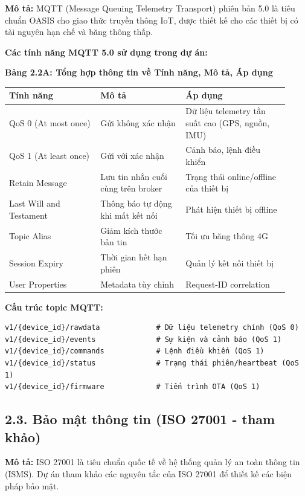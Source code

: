 \documentclass[13pt,a4paper]{extarticle}
\newcounter{none} %
\newcommand{\thesislongtableorignewline}{}
\let\thesislongtableorignewline\\
\renewcommand{\\}{\thesislongtableorignewline\hline}%
\let\\\thesislongtableorignewline
\newcommand{\thesistabletitle}[1]{%
  \begin{center}\textbf{#1}\end{center}%
}
\begin{document}
\textbf{Mô tả:} MQTT (Message Queuing Telemetry Transport) phiên bản 5.0
là tiêu chuẩn OASIS cho giao thức truyền thông IoT, được thiết kế cho
các thiết bị có tài nguyên hạn chế và băng thông thấp.

\textbf{Các tính năng MQTT 5.0 sử dụng trong dự án:}

{\def\LTcaptype{none} %
\thesistabletitle{Bảng 2.2A: Tổng hợp thông tin về Tính năng, Mô tả, Áp dụng}

\begin{longtable}{|p{0.30\linewidth}|p{0.28\linewidth}|p{0.34\linewidth}|}
\hline \textbf{Tính năng} & \textbf{Mô tả} & \textbf{Áp dụng} \\
\hline
\endhead
\hline
\endlastfoot
QoS 0 (At most once) & Gửi không xác nhận & Dữ liệu telemetry tần suất
cao (GPS, nguồn, IMU) \\
QoS 1 (At least once) & Gửi với xác nhận & Cảnh báo, lệnh điều khiển \\
Retain Message & Lưu tin nhắn cuối cùng trên broker & Trạng thái
online/offline của thiết bị \\
Last Will and Testament & Thông báo tự động khi mất kết nối & Phát hiện
thiết bị offline \\
Topic Alias & Giảm kích thước bản tin & Tối ưu băng thông 4G \\
Session Expiry & Thời gian hết hạn phiên & Quản lý kết nối thiết bị \\
User Properties & Metadata tùy chỉnh & Request-ID correlation \\
\end{longtable}
}

\textbf{Cấu trúc topic MQTT:}

\begin{verbatim}
v1/{device_id}/rawdata             # Dữ liệu telemetry chính (QoS 0)
v1/{device_id}/events              # Sự kiện và cảnh báo (QoS 1)
v1/{device_id}/commands            # Lệnh điều khiển (QoS 1)
v1/{device_id}/status              # Trạng thái phiên/heartbeat (QoS 1)
v1/{device_id}/firmware            # Tiến trình OTA (QoS 1)
\end{verbatim}

\subsection{2.3. Bảo mật thông tin (ISO 27001 - tham
khảo)}\label{23-bux1ea3o-mux1eadt-thuxf4ng-tin-iso-27001---tham-khux1ea3o}

\textbf{Mô tả:} ISO 27001 là tiêu chuẩn quốc tế về hệ thống quản lý an
toàn thông tin (ISMS). Dự án tham khảo các nguyên tắc của ISO 27001 để
thiết kế các biện pháp bảo mật.
\end{document}
